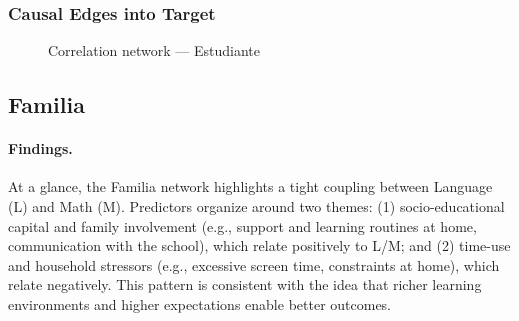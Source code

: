 \documentclass[11pt, a4paper]{article}
\begin{document}
\subsubsection*{Causal Edges into Target}
\begin{figure}[h]
  \centering
  \caption{Correlation network — Estudiante}
\end{figure}

\subsection{Familia}
\paragraph{Findings.}
At a glance, the Familia network highlights a tight coupling between Language (L) and Math (M). Predictors organize around two themes: (1) socio-educational capital and family involvement (e.g., support and learning routines at home, communication with the school), which relate positively to L/M; and (2) time-use and household stressors (e.g., excessive screen time, constraints at home), which relate negatively. This pattern is consistent with the idea that richer learning environments and higher expectations enable better outcomes.
\end{document}
